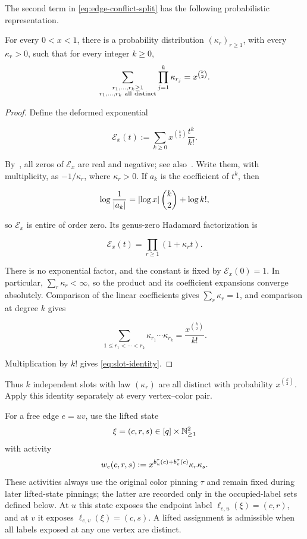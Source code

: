 The second term in \eqref{eq:edge-conflict-split} has the following
probabilistic representation.

\begin{lemma}\label{lem:slot-fact}
For every \(0<x<1\), there is a probability distribution
\((\kappa_r)_{r\ge1}\), with every \(\kappa_r>0\), such that for every integer
\(k\ge0\),
\begin{equation}\label{eq:slot-identity}
  \sum_{\substack{r_1,\ldots,r_k\ge1\\
                  r_1,\ldots,r_k\ {\rm all\ distinct}}}
       \prod_{j=1}^k \kappa_{r_j}
  =x^{\binom k2}.
\end{equation}
\end{lemma}

\begin{proof}
Define the deformed exponential

\[
  \mathcal E_x(t):=\sum_{k\ge0}x^{\binom k2}\frac{t^k}{k!}.
\]

By~\cite{MFB1972,Iserles1993}, all zeros of \(\mathcal E_x\) are real and
negative; see also~\cite[\S1, pp.~312--313]{WangZhang2018}.  Write them,
with multiplicity, as \(-1/\kappa_r\), where \(\kappa_r>0\).  If \(a_k\)
is the coefficient of \(t^k\), then

\[
  \log\frac1{\left|a_k\right|}
  =\left|\log x\right|\binom k2+\log k!,
\]

so \(\mathcal E_x\) is entire of order zero.  Its genus-zero Hadamard
factorization is

\[
  \mathcal E_x(t)
  =\prod_{r\ge1}(1+\kappa_r t).
\]

There is no exponential factor, and the constant is fixed by
\(\mathcal E_x(0)=1\).  In particular,
\(\sum_r\kappa_r<\infty\), so the product and its coefficient
expansions converge absolutely.
Comparison of the linear coefficients gives \(\sum_r\kappa_r=1\), and
comparison at degree \(k\) gives

\[
  \sum_{1\le r_1<\cdots<r_k}
       \kappa_{r_1}\cdots\kappa_{r_k}
  =\frac{x^{\binom k2}}{k!}.
\]

Multiplication by \(k!\) gives \eqref{eq:slot-identity}.
\end{proof}

Thus \(k\) independent slots with law \((\kappa_r)\) are all distinct with
probability \(x^{\binom k2}\).  Apply this identity separately at every
vertex--color pair.

For a free edge \(e=uv\), use the lifted state
\[
  \xi=(c,r,s)\in[q]\times\mathbb N_{\ge1}^2
\]
with activity
\begin{equation}\label{eq:edge-slot-activity}
  w_e(c,r,s)
  :=x^{b_u^\tau(c)+b_v^\tau(c)}\kappa_r\kappa_s.
\end{equation}
These activities always use the original color pinning $\tau$ and remain
fixed during later lifted-state pinnings; the latter are recorded only in
the occupied-label sets defined below.
At \(u\) this state exposes the endpoint label
\(\ell_{e,u}(\xi)=(c,r)\), and at \(v\) it exposes
\(\ell_{e,v}(\xi)=(c,s)\).  A lifted assignment is admissible when all
labels exposed at any one vertex are distinct.

